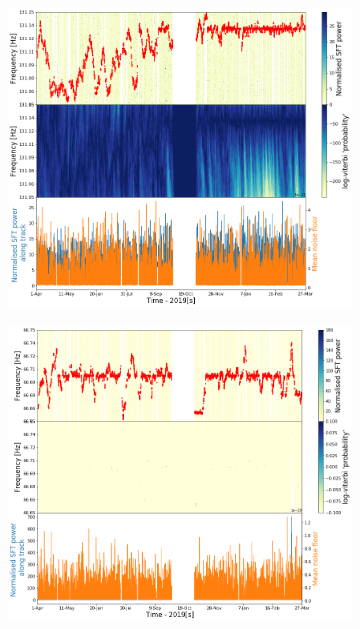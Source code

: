 %
\begin{figure}[hpt]
	\centering
	\begin{subfigure}[h]{0.49\textwidth}
		\includegraphics[width=\textwidth]{C6_detchar/track_F131_05_131_15.png}
		\caption{\label{detchar:soap:unknown:1}}
	\end{subfigure}
	\begin{subfigure}[h]{0.49\textwidth}
		\includegraphics[width=\textwidth]{C6_detchar/track_F66_65_66_75.png}
		\caption{\label{detchar:soap:unknown:2}}
	\end{subfigure}
	

\end{figure}
